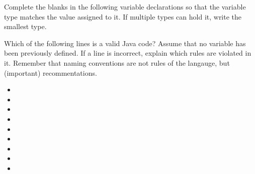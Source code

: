 
\exercisesection

\begin{exercise}
Complete the blanks in the following variable declarations so that the variable type matches the value assigned to it. If multiple types can hold it, write the smallest type. 
\item {}
\item {}
\item {}
\item {}
\item {}
\item {}
\end{exercise}

\begin{exercise}
Which of the following lines is a valid Java code? Assume that no variable has been previously defined. If a line is incorrect, explain which rules are violated in it. Remember that naming conventions are not rules of the langauge, but (important) recommentations.
\begin{itemize}
\item {}
\item {}
\item {}
\item {}
\item {}
\item {}
\item {}
\item {}
\item {}
\end{itemize}
\end{exercise}

